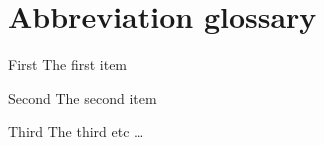 \chapter{Abbreviation glossary}

\begin{nicgloss}
  \item[First] The first item
  \item[Second] The second item
  \item[Third] The third etc \ldots
\end{nicgloss}
